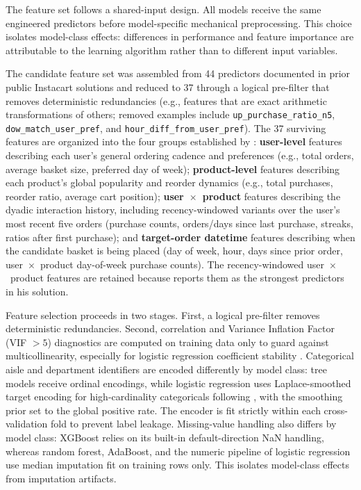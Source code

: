 \documentclass[10pt,twocolumn]{article}
\begin{document}
The feature set follows a shared-input design. All models receive the same engineered predictors before model-specific mechanical preprocessing. This choice isolates model-class effects: differences in performance and feature importance are attributable to the learning algorithm rather than to different input variables.

The candidate feature set was assembled from 44 predictors documented in prior public Instacart solutions and reduced to 37 through a logical pre-filter that removes deterministic redundancies (e.g., features that are exact arithmetic transformations of others; removed examples include \texttt{up\_purchase\_ratio\_n5}, \texttt{dow\_match\_user\_pref}, and \texttt{hour\_diff\_from\_user\_pref}). The 37 surviving features are organized into the four groups established by \citet{onodera2017instacart}: \textbf{user-level} features describing each user's general ordering cadence and preferences (e.g., total orders, average basket size, preferred day of week); \textbf{product-level} features describing each product's global popularity and reorder dynamics (e.g., total purchases, reorder ratio, average cart position); \textbf{user~$\times$~product} features describing the dyadic interaction history, including recency-windowed variants over the user's most recent five orders (purchase counts, orders/days since last purchase, streaks, ratios after first purchase); and \textbf{target-order datetime} features describing when the candidate basket is being placed (day of week, hour, days since prior order, user~$\times$~product day-of-week purchase counts). The recency-windowed user~$\times$~product features are retained because \citet{onodera2017instacart} reports them as the strongest predictors in his solution.

Feature selection proceeds in two stages. First, a logical pre-filter removes deterministic redundancies. Second, correlation and Variance Inflation Factor (VIF $> 5$) diagnostics are computed on training data only to guard against multicollinearity, especially for logistic regression coefficient stability \citep{belsley1980regression}. Categorical aisle and department identifiers are encoded differently by model class: tree models receive ordinal encodings, while logistic regression uses Laplace-smoothed target encoding for high-cardinality categoricals following \citet{micci2001target}, with the smoothing prior set to the global positive rate. The encoder is fit strictly within each cross-validation fold to prevent label leakage. Missing-value handling also differs by model class: XGBoost relies on its built-in default-direction NaN handling, whereas random forest, AdaBoost, and the numeric pipeline of logistic regression use median imputation fit on training rows only. This isolates model-class effects from imputation artifacts.
\end{document}
